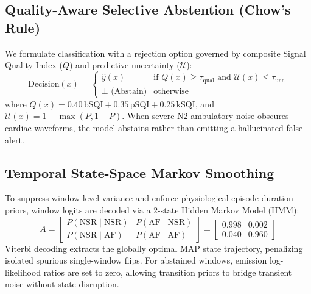 \documentclass[10pt,twocolumn,letterpaper]{article}
\begin{document}
\subsection{Quality-Aware Selective Abstention (Chow's Rule)}
We formulate classification with a rejection option governed by composite Signal Quality Index ($Q$) and predictive uncertainty ($\mathcal{U}$):
\begin{equation}
\text{Decision}(x) = \begin{cases} \hat{y}(x) & \text{if } Q(x) \ge \tau_{\text{qual}} \text{ and } \mathcal{U}(x) \le \tau_{\text{unc}} \\ \bot \text{ (Abstain)} & \text{otherwise} \end{cases}
\end{equation}
where $Q(x) = 0.40\,\text{bSQI} + 0.35\,\text{pSQI} + 0.25\,\text{kSQI}$, and $\mathcal{U}(x) = 1 - \max(P, 1-P)$. When severe N2 ambulatory noise obscures cardiac waveforms, the model abstains rather than emitting a hallucinated false alert.

\subsection{Temporal State-Space Markov Smoothing}
To suppress window-level variance and enforce physiological episode duration priors, window logits are decoded via a 2-state Hidden Markov Model (HMM):
\begin{equation}
A = \begin{bmatrix} P(\text{NSR} \mid \text{NSR}) & P(\text{AF} \mid \text{NSR}) \\ P(\text{NSR} \mid \text{AF}) & P(\text{AF} \mid \text{AF}) \end{bmatrix} = \begin{bmatrix} 0.998 & 0.002 \\ 0.040 & 0.960 \end{bmatrix}
\end{equation}
Viterbi decoding extracts the globally optimal MAP state trajectory, penalizing isolated spurious single-window flips. For abstained windows, emission log-likelihood ratios are set to zero, allowing transition priors to bridge transient noise without state disruption.
\end{document}
